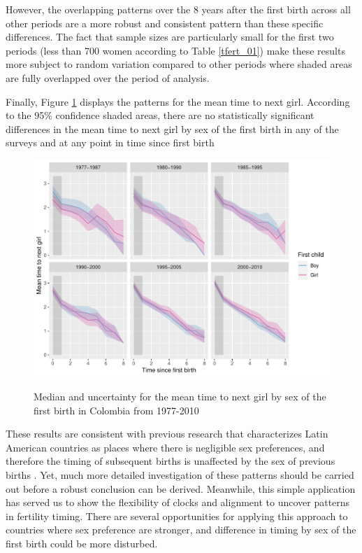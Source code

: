 \documentclass[a4paper,left=1.25cm,right=1.25cm,top=1.25cm,bottom=1.25cm]{article}
\begin{document}
However, the overlapping patterns over the 8 years after the first birth across all other periods are a more robust and consistent pattern than these specific differences. The fact that sample sizes are particularly small for the first two periods (less than 700 women according to Table \ref{tfert_01}) make these results more subject to random variation compared to other periods where shaded areas are fully overlapped over the period of analysis.

Finally,  Figure \ref{fert_03} displays the patterns for the mean time to next girl. According to the 95\% confidence shaded areas, there are no statistically significant differences in the mean time to next girl by sex of the first birth in any of the surveys and at any point in time since first birth

\begin{figure}[H]
\centering
    \includegraphics[scale=0.8]{Figures/colombia/colombia_period_new_3.pdf}\\
    \caption{Median and uncertainty for the mean time to next girl by sex of the first birth in Colombia from 1977-2010}
        \label{fert_03}
\end{figure}

These results are consistent with previous research that characterizes Latin American countries as places where there is negligible sex preferences, and therefore the timing of subsequent births is unaffected by the sex of previous births \cite{filmer2008}. Yet, much more detailed investigation of these patterns should be carried out before a robust conclusion can be derived. Meanwhile, this simple application has served us to show the flexibility of clocks and alignment to uncover patterns in fertility timing. There are several opportunities for applying this approach to countries where sex preference are stronger, and difference in timing by sex of the first birth could be more disturbed.
\end{document}
